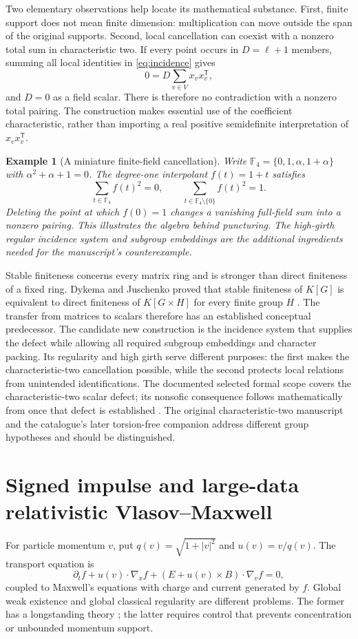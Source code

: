 \documentclass[11pt]{article}
\newcommand{\F}{\mathbb F}
\newtheorem{example}{Example}[section]
\begin{document}
Two elementary observations help locate its mathematical substance.
First, finite support does not mean finite dimension: multiplication can
move outside the span of the original supports. Second, local cancellation
can coexist with a nonzero total sum in characteristic two. If every
point occurs in $D=\ell+1$ members, summing all local identities in
\eqref{eq:incidence} gives
\[
 0=D\sum_{v\in V}x_vx_v^{\mathsf T},
\]
and $D=0$ as a field scalar. There is therefore no contradiction with a
nonzero total pairing. The construction makes essential use of the
coefficient characteristic, rather than importing a real positive
semidefinite interpretation of $x_vx_v^{\mathsf T}$.

\begin{example}[A miniature finite-field cancellation]
Write $\F_4=\{0,1,\alpha,1+\alpha\}$ with
$\alpha^2+\alpha+1=0$. The degree-one interpolant $f(t)=1+t$ satisfies
\[
 \sum_{t\in\F_4}f(t)^2=0,\qquad
 \sum_{t\in\F_4\setminus\{0\}}f(t)^2=1.
\]
Deleting the point at which $f(0)=1$ changes a vanishing full-field sum
into a nonzero pairing. This illustrates the algebra behind puncturing.
The high-girth regular incidence system and subgroup embeddings are the
additional ingredients needed for the manuscript's counterexample.
\end{example}

Stable finiteness concerns every matrix ring and is stronger than direct
finiteness of a fixed ring. Dykema and Juschenko proved that stable
finiteness of $K[G]$ is equivalent to direct finiteness of $K[G\times H]$
for every finite group $H$ \citep{DykemaJuschenko2015}. The transfer from
matrices to scalars therefore has an established conceptual predecessor.
The candidate new construction is the incidence system that supplies the
defect while allowing all required subgroup embeddings and character
packing. Its regularity and high girth serve different purposes: the
first makes the characteristic-two cancellation possible, while the
second protects local relations from unintended identifications. The
documented selected formal scope covers the characteristic-two scalar
defect; its nonsofic consequence follows mathematically from
\citet{ElekSzabo2004} once that defect is established
\citep{OpenAIScope197}. The original characteristic-two manuscript and
the catalogue's later torsion-free companion address different group
hypotheses and should be distinguished.

\section{Signed impulse and large-data relativistic Vlasov--Maxwell}
\label{sec:pde}
For particle momentum $v$, put $q(v)=\sqrt{1+|v|^2}$ and
$u(v)=v/q(v)$. The transport equation is
\[
 \partial_t f+u(v)\cdot\nabla_x f+
 (E+u(v)\times B)\cdot\nabla_v f=0,
\]
coupled to Maxwell's equations with charge and current generated by $f$.
Global weak existence and global classical regularity are different
problems. The former has a longstanding theory
\citep{DiPernaLions1989,Rein2004Weak}; the latter requires control that
prevents concentration or unbounded momentum support.
\end{document}

